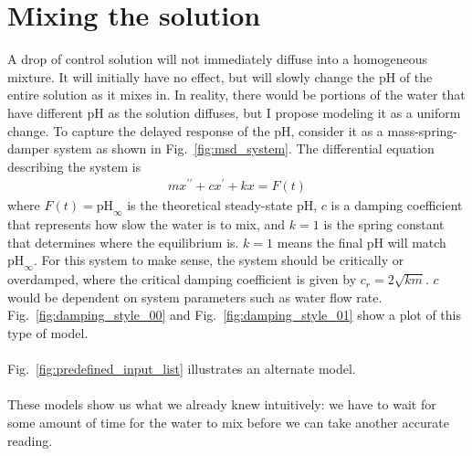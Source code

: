 \documentclass[12pt]{article}
\newcommand{\pH}{\text{pH}}
\begin{document}
\section{Mixing the solution}
A drop of control solution will not immediately diffuse into a homogeneous mixture. It will initially have no effect, but will slowly change the pH of the entire solution as it mixes in. In reality, there would be portions of the water that have different pH as the solution diffuses, but I propose modeling it as a uniform change. To capture the delayed response of the pH, consider it as a mass-spring-damper system as shown in Fig.~\ref{fig:msd_system}.
The differential equation describing the system is
\begin{align*}
mx^{\prime\prime}+cx^{\prime}+kx = F(t)
\end{align*}
where $F(t)=\pH_{\infty}$ is the theoretical steady-state pH, $c$ is a damping coefficient that represents how slow the water is to mix, and $k=1$ is the spring constant that determines where the equilibrium is. $k=1$ means the final pH will match $\pH_{\infty}$. For this system to make sense, the system should be critically or overdamped, where the critical damping coefficient is given by $c_r = 2\sqrt{km}$. $c$ would be dependent on system parameters such as water flow rate. Fig.~\ref{fig:damping_style_00} and Fig.~\ref{fig:damping_style_01} show a plot of this type of model.
\\\\
Fig.~\ref{fig:predefined_input_list} illustrates an alternate model.
\\\\
These models show us what we already knew intuitively: we have to wait for some amount of time for the water to mix before we can take another accurate reading. 

\end{document}
